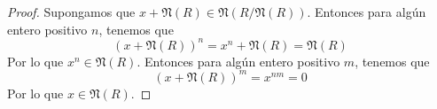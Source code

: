 \begin{problem}[30]
\end{problem}
\newcommand{\rad}{\mathfrak{N}}

\begin{proof}
    Supongamos que $ x + \rad(R) \in \rad(R/\rad(R))$. Entonces para algún entero positivo $n$, tenemos que
    $$ (x + \rad(R))^n = x^n + \rad(R) = \rad(R) $$
    Por lo que $x^n \in \rad(R)$. Entonces para algún entero positivo $m$, tenemos que
    $$ (x + \rad(R))^m = x^{nm} = 0$$
    Por lo que $x \in \rad(R)$.
\end{proof}